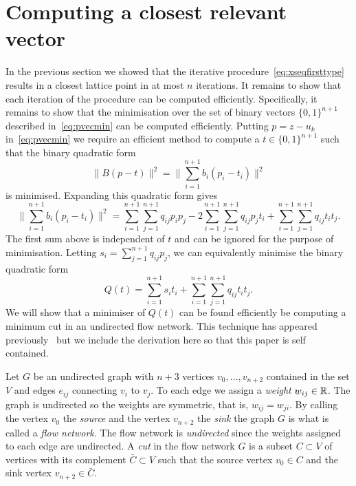 \documentclass[final,leqno]{siamltex}
\begin{document}
\section{Computing a closest relevant vector}\label{sec:comp-clos-relev}

In the previous section we showed that the iterative procedure~\eqref{eq:xseqfirsttype} results in a closest lattice point in at most $n$ iterations.  It remains to show that each iteration of the procedure can be computed efficiently.  Specifically, it remains to show that the minimisation over the set of binary vectors $\{0,1\}^{n+1}$ described in~\eqref{eq:pvecmin} can be computed efficiently.  Putting $p = z - u_k$ in~\eqref{eq:pvecmin} we require an efficient method to compute a $t \in \{0,1\}^{n+1}$ such that the binary quadratic form
\[
\| B(p - t) \|^2 = \| \sum_{i=1}^{n+1} b_i (p_i - t_i) \|^2
\]
is minimised.  Expanding this quadratic form gives
\[
\| \sum_{i=1}^{n+1} b_i (p_i - t_i) \|^2 =  \sum_{i=1}^{n+1}\sum_{j=1}^{n+1} q_{ij}p_i p_j -  2\sum_{i=1}^{n+1}\sum_{j=1}^{n+1} q_{ij}p_j t_i + \sum_{i=1}^{n+1}\sum_{j=1}^{n+1} q_{ij} t_i t_j.
\]
The first sum above is independent of $t$ and can be ignored for the purpose of minimisation.  Letting $s_i = \sum_{j=1}^{n+1} q_{ij}p_j$, we can equivalently minimise the binary quadratic form
\begin{equation}\label{eq:quadformnp}
Q(t) = \sum_{i=1}^{n+1} s_i t_i + \sum_{i=1}^{n+1}\sum_{j=1}^{n+1} q_{ij} t_i t_j.
\end{equation}
We will show that a minimiser of $Q(t)$ can be found efficiently be computing a minimum cut in an undirected flow network.
This technique has appeared previously~\cite{Picard_min_cuts_1974,Sankaran_solving_CDMA_mincut_1998,Ulukus_cdma_mincut_1998,Cormen2001} but we include the derivation here so that this paper is self contained.

Let $G$ be an undirected graph with $n+3$ vertices $v_0, \dots, v_{n+2}$ contained in the set $V$ and edges $e_{ij}$ connecting $v_i$ to $v_j$.  To each edge we assign a \emph{weight} $w_{ij} \in {\mathbb R}$.  The graph is undirected so the weights are symmetric, that is, $w_{ij} = w_{ji}$.  By calling the vertex $v_0$ the \emph{source} and the vertex $v_{n+2}$ the \emph{sink} the graph $G$ is what is called a \emph{flow network}.  The flow network is \emph{undirected} since the weights assigned to each edge are undirected.  A \emph{cut} in the flow network $G$ is a subset $C \subset V$ of vertices with its complement $\bar{C} \subset V$ such that the source vertex $v_0 \in C$ and the sink vertex $v_{n+2} \in \bar{C}$.  %
\end{document}
